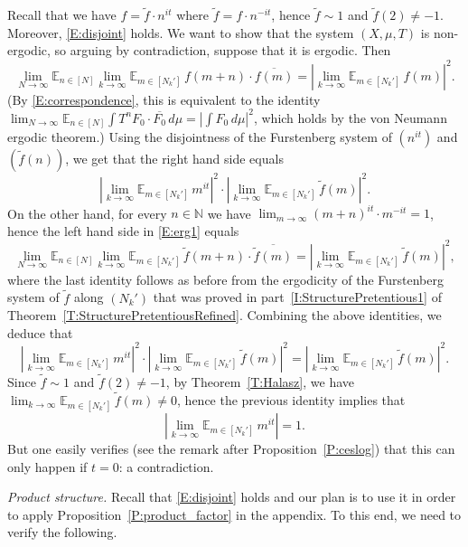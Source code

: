 \documentclass[11pt]{amsart}
\theoremstyle{definition}
\newcommand{\E}{{\mathbb E}}
\newcommand{\N}{{\mathbb N}}
\begin{document}
  Recall that we have
    $f=\tilde{f}\cdot n^{it}$ where $\tilde{f}=f\cdot n^{-it}$, hence $\tilde{f}\sim 1$ and $\tilde{f}(2)\neq -1$.
    Moreover, \eqref{E:disjoint} holds.
 We want to show that the system $(X,\mu,T)$ is non-ergodic, so arguing by contradiction, suppose that it  is ergodic.
Then
   \begin{equation}\label{E:erg1}
\lim_{N\to\infty}   \E_{n\in[N]}\lim_{k\to\infty}\E_{m\in [N_k']} \, f(m+n)\cdot \overline{f(m)} =|\lim_{k\to\infty} \E_{m\in [N_k']}\, f(m)|^2.
   \end{equation}
   (By \eqref{E:correspondence},  this is equivalent to the identity $\lim_{N\to\infty}   \E_{n\in[N]}\int T^nF_0\cdot \overline{F_0}\, d\mu=|\int F_0\, d\mu|^2$, which holds by the von Neumann ergodic theorem.)
Using the disjointness of the Furstenberg system of $(n^{it})$ and $(\tilde{f}(n))$, we get that     the right hand side  equals
   $$
   |\lim_{k\to\infty} \E_{m\in [N_k']}\, m^{it}|^2\cdot |\lim_{k\to\infty} \E_{m\in [N_k']}\, \tilde{f}(m)|^2.
   $$
   On the other hand, for every $n\in\N$ we have $\lim_{m\to\infty} (m+n)^{it}\cdot m^{-it}=1$, hence the left hand side in \eqref{E:erg1} equals
 $$
  \lim_{N\to\infty}   \E_{n\in[N]}\lim_{k\to\infty}\E_{m\in [N_k']} \, \tilde{f}(m+n)\cdot \overline{\tilde{f}(m)}=|\lim_{k\to\infty} \E_{m\in [N_k']}\, \tilde{f}(m)|^2,
   $$
   where the last identity follows as before from the ergodicity of the Furstenberg system  of $\tilde{f}$ along $(N_k')$ that was proved in  part~\eqref{I:StructurePretentious1} of Theorem~\ref{T:StructurePretentiousRefined}. Combining the above identities, we deduce that
$$   |\lim_{k\to\infty} \E_{m\in [N_k']}\, m^{it}|^2\cdot |\lim_{k\to\infty} \E_{m\in [N_k']}\, \tilde{f}(m)|^2=
   |\lim_{k\to\infty} \E_{m\in [N_k']}\, \tilde{f}(m)|^2 .
   $$
   Since $\tilde{f}\sim 1$ and $\tilde{f}(2)\neq -1$, by Theorem~\ref{T:Halasz}, we have  $\lim_{k\to\infty} \E_{m\in [N_k']}\, \tilde{f}(m)\neq 0$, hence the previous identity implies that
   $$
    |\lim_{k\to\infty} \E_{m\in [N_k']}\, m^{it}|=1.
   $$
   But one easily verifies (see the remark after Proposition~\ref{P:ceslog}) that this can only happen if $t=0$: a contradiction.


 \smallskip
 {\em Product structure.}
Recall that  \eqref{E:disjoint} holds and our plan is to use it in order to apply Proposition~\ref{P:product_factor} in the appendix. To this end, we need  to verify the following.
\end{document}
